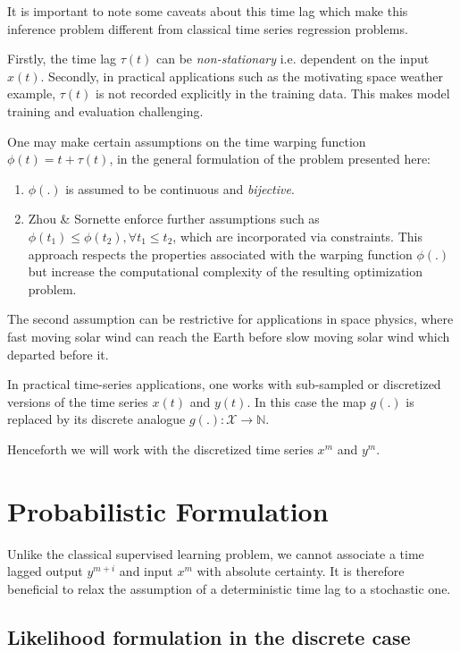 \documentclass[envcountsect,runningheads]{llncs}
\theoremstyle{etoile}
\begin{document}
It is important to note some caveats about this time lag which make this inference problem 
different from classical time series regression problems.

Firstly, the time lag $\tau(t)$ can be \emph{non-stationary} i.e. dependent on the input $x(t)$. 
Secondly, in practical applications such as the motivating space weather example, $\tau(t)$ 
is not recorded explicitly in the training data. This makes model training and evaluation 
challenging.

One may make certain assumptions on the time warping function $\phi(t) = t + \tau(t)$, in the general 
formulation of the problem presented here: 

\begin{enumerate}
    \item $\phi(.)$ is assumed to be continuous and \emph{bijective}.
    \item Zhou \& Sornette \cite{ZHOU2006195} enforce further assumptions 
          such as $\phi(t_1) \leq \phi(t_2), \forall t_1 \leq t_2$, which 
          are incorporated via constraints. This approach respects the 
          properties associated with the warping function $\phi(.)$ but 
          increase the computational complexity of the resulting 
          optimization problem.
\end{enumerate}

The second assumption can be restrictive for applications in space physics, where fast moving 
solar wind can reach the Earth before slow moving solar wind which departed before it. 

In practical time-series applications, one works with sub-sampled or discretized versions of the time 
series $x(t)$ and $y(t)$. In this case the map $g(.)$ is replaced by its discrete analogue 
$g(.):\mathcal{X}  \rightarrow \mathbb{N}$. 

Henceforth we will work with the discretized time series $x^m$ and $y^m$.

\section{Probabilistic Formulation}

Unlike the classical supervised learning problem, we cannot associate a time lagged output
$y^{m + i}$ and input $x^m$ with absolute certainty. It is therefore beneficial to relax 
the assumption of a deterministic time lag to a stochastic one.

\subsection{Likelihood formulation in the discrete case}
\end{document}
